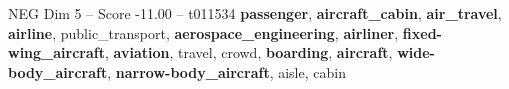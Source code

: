 \begin{textsample}{NEG Dim 5 – Score -11.00 – t011534}  \label{ex:f5_neg_037}
\textbf{passenger}, \textbf{aircraft\_cabin}, \textbf{air\_travel}, \textbf{airline}, public\_transport, \textbf{aerospace\_engineering}, \textbf{airliner}, \textbf{fixed-wing\_aircraft}, \textbf{aviation}, travel, crowd, \textbf{boarding}, \textbf{aircraft}, \textbf{wide-body\_aircraft}, \textbf{narrow-body\_aircraft}, aisle, cabin

\end{textsample}
